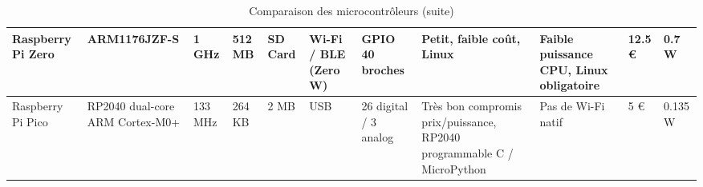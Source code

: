 \begin{table}[!ht]
{{{\begin{tabular}{
                    |p{3.5cm}|p{2.5cm}|p{2.2cm}|p{1.2cm}|p{1.4cm}|
                    p{2.7cm}|p{2.5cm}|p{3cm}|p{3cm}|p{1.8cm}|p{2.2cm}|
                    }
                    \hline
                    Raspberry Pi Zero                & ARM1176JZF-S                      & 1 GHz                 & 512 MB                  & SD Card        & Wi-Fi / BLE (Zero W) & GPIO 40 broches        & Petit, faible coût, Linux                                              & Faible puissance CPU, Linux obligatoire             & 12.5 € & 0.7 W   \\
                    \hline
                    Raspberry Pi Pico                & RP2040 dual-core ARM Cortex-M0+   & 133 MHz               & 264 KB                  & 2 MB           & USB                  & 26 digital / 3 analog  & Très bon compromis prix/puissance, RP2040 programmable C / MicroPython & Pas de Wi-Fi natif                                  & 5 €    & 0.135 W \\
                    \hline
                \end{tabular}
            }
        }
        \caption{Comparaison des microcontrôleurs (suite)}
    }
\end{table}

